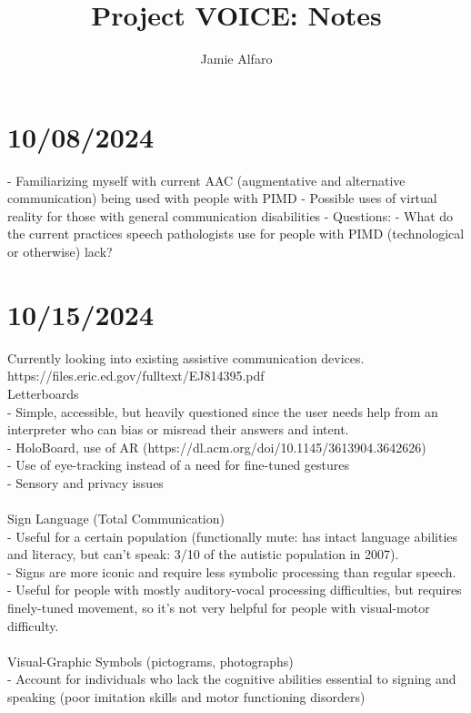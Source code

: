 \documentclass{article}
\author{Jamie Alfaro}
\title{Project VOICE: Notes}
\begin{document}
	
	\maketitle
	
	\section{10/08/2024}
	- Familiarizing myself with current AAC (augmentative and alternative communication) being used with people with PIMD
    - Possible uses of virtual reality for those with general communication disabilities
    - Questions: 
        - What do the current practices speech pathologists use for people with PIMD (technological or otherwise) lack?

	
	\section{10/15/2024}
	Currently looking into existing assistive communication devices. \\
	https://files.eric.ed.gov/fulltext/EJ814395.pdf \\
	
	Letterboards \\
	- Simple, accessible, but heavily questioned since the user needs help from an interpreter who can bias or misread their answers and intent. \\
	- HoloBoard, use of AR (https://dl.acm.org/doi/10.1145/3613904.3642626)\\
    - Use of eye-tracking instead of a need for fine-tuned gestures \\
	- Sensory and privacy issues \\
	\\
	
	Sign Language (Total Communication) \\
	- Useful for a certain population (functionally mute: has intact language abilities and literacy, but can’t speak:  3/10 of the autistic population in 2007). \\
	- Signs are more iconic and require less symbolic processing than regular speech. \\
	- Useful for people with mostly auditory-vocal processing difficulties, but requires finely-tuned movement, so it’s not very helpful for people with visual-motor difficulty. \\
	\\
	
	Visual-Graphic Symbols (pictograms, photographs) \\
	- Account for individuals who lack the cognitive abilities essential to signing and speaking (poor imitation skills and motor functioning disorders) \\
	\\
	
\end{document}
